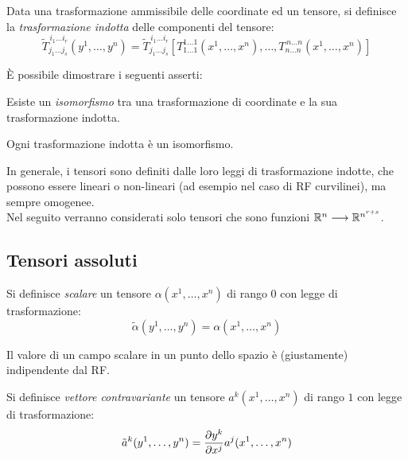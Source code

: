 \begin{definition}
	Data una trasformazione ammissibile delle coordinate ed un tensore, si definisce la \textit{trasformazione indotta} delle componenti del tensore:
	\begin{equation}
		\tilde{T}^{\,i_1 \dots i_r}_{j_1 \dots j_s} (y^1, \dots, y^n) = \tilde{T}^{\,i_1 \dots i_r}_{j_1 \dots j_s} \left[ T^{1 \dots 1}_{1 \dots 1} (x^1, \dots, x^n), \dots, T^{\,n \dots n}_{n \dots n} (x^1, \dots, x^n) \right]
		\label{eq:2}
	\end{equation}
\end{definition}

È possibile dimostrare i seguenti asserti:

\begin{theorem}
	Esiste un \textit{isomorfismo} tra una trasformazione di coordinate e la sua trasformazione indotta.
\end{theorem}

\begin{proposition}
	Ogni trasformazione indotta è un isomorfismo.
\end{proposition}

In generale, i tensori sono definiti dalle loro leggi di trasformazione indotte, che possono essere lineari o non-lineari (ad esempio nel caso di RF curvilinei), ma sempre omogenee. \\
Nel seguito verranno considerati solo tensori che sono funzioni $ \mathbb{R}^n \longrightarrow \mathbb{R}^{n^{r+s}} $.


\subsection{Tensori assoluti}


\begin{definition}
	Si definisce \textit{scalare} un tensore $ \alpha (x^1, \dots, x^n) $ di rango $ 0 $ con legge di trasformazione:
	\begin{equation}
		\tilde{\alpha} (y^1, \dots, y^n) = \alpha (x^1, \dots, x^n)
		\label{eq:3}
	\end{equation}
\end{definition}

Il valore di un campo scalare in un punto dello spazio è (giustamente) indipendente dal RF.

\begin{definition}
	Si definisce \textit{vettore contravariante} un tensore $ a^k (x^1, \dots, x^n) $ di rango $ 1 $ con legge di trasformazione:
	\begin{equation}
		\tilde{a}^k (y^1, \dots, y^n) = \frac{\partial y^k}{\partial x^j} a^j (x^1, \dots, x^n)
		\label{eq:4}
	\end{equation}
\end{definition}

